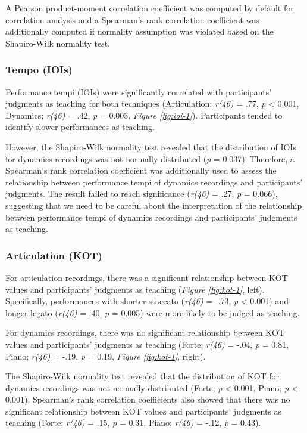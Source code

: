 \documentclass[
  man,floatsintext]{apa6}
\begin{document}
A Pearson product-moment correlation coefficient was computed by default for correlation analysis and a Spearman's rank correlation coefficient was additionally computed if normality assumption was violated based on the Shapiro-Wilk normality test.

\hypertarget{tempo-iois}{%
\subsubsection{Tempo (IOIs)}\label{tempo-iois}}

Performance tempi (IOIs) were significantly correlated with participants' judgments as teaching for both techniques (Articulation; \emph{r(46)} = .77, \emph{p} \textless{} 0.001, Dynamics; \emph{r(46)} = .42, \emph{p} = 0.003, \emph{Figure \ref{fig:ioi-1}}). Participants tended to identify slower performances as teaching.

However, the Shapiro-Wilk normality test revealed that the distribution of IOIs for dynamics recordings was not normally distributed (\emph{p} = 0.037). Therefore, a Spearman's rank correlation coefficient was additionally used to assess the relationship between performance tempi of dynamics recordings and participants' judgments. The result failed to reach significance (\emph{r(46)} = .27, \emph{p} = 0.066), suggesting that we need to be careful about the interpretation of the relationship between performance tempi of dynamics recordings and participants' judgments as teaching.

\hypertarget{articulation-kot}{%
\subsubsection{Articulation (KOT)}\label{articulation-kot}}

For articulation recordings, there was a significant relationship between KOT values and participants' judgments as teaching (\emph{Figure \ref{fig:kot-1}}, left). Specifically, performances with shorter staccato (\emph{r(46)} = -.73, \emph{p} \textless{} 0.001) and longer legato (\emph{r(46)} = .40, \emph{p} = 0.005) were more likely to be judged as teaching.

For dynamics recordings, there was no significant relationship between KOT values and participants' judgments as teaching (Forte; \emph{r(46)} = -.04, \emph{p} = 0.81, Piano; \emph{r(46)} = -.19, \emph{p} = 0.19, \emph{Figure \ref{fig:kot-1}}, right).

The Shapiro-Wilk normality test revealed that the distribution of KOT for dynamics recordings was not normally distributed (Forte; \emph{p} \textless{} 0.001, Piano; \emph{p} \textless{} 0.001). Spearman's rank correlation coefficients also showed that there was no significant relationship between KOT values and participants' judgments as teaching (Forte; \emph{r(46)} = .15, \emph{p} = 0.31, Piano; \emph{r(46)} = -.12, \emph{p} = 0.43).
\end{document}
